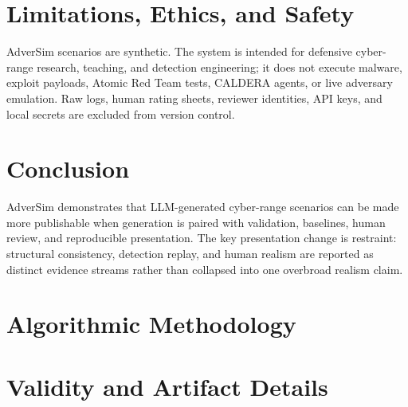 \documentclass[conference]{IEEEtran}
\begin{document}


\section{Limitations, Ethics, and Safety}

AdverSim scenarios are synthetic. The system is intended for defensive
cyber-range research, teaching, and detection engineering; it does not execute
malware, exploit payloads, Atomic Red Team tests, CALDERA agents, or live
adversary emulation. Raw logs, human rating sheets, reviewer identities, API
keys, and local secrets are excluded from version control.

\section{Conclusion}

AdverSim demonstrates that LLM-generated cyber-range scenarios can be made more
publishable when generation is paired with validation, baselines, human review,
and reproducible presentation. The key presentation change is restraint:
structural consistency, detection replay, and human realism are reported as
distinct evidence streams rather than collapsed into one overbroad realism
claim.

\appendices
\section{Algorithmic Methodology}
\label{sec:appendix-methods}


\section{Validity and Artifact Details}

\end{document}
